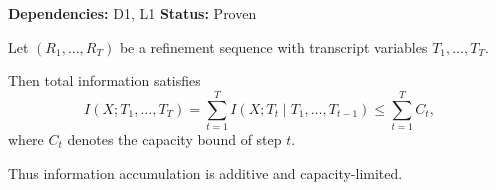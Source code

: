 \begin{lemma}
\textbf{Dependencies: } D1, L1
\textbf{Status: } Proven

Let $(R_1,\dots,R_T)$ be a refinement sequence with transcript variables
$T_1,\dots,T_T$.

Then total information satisfies
\[
I(X;T_1,\dots,T_T)
= \sum_{t=1}^T I(X;T_t \mid T_1,\dots,T_{t-1})
\leq \sum_{t=1}^T C_t,
\]
where $C_t$ denotes the capacity bound of step $t$.

Thus information accumulation is additive and capacity-limited.
\end{lemma}
